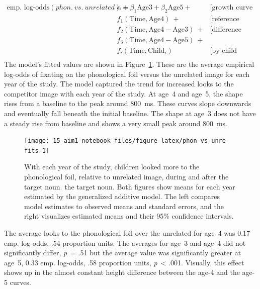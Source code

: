 \documentclass [11pt, proquest] {uwthesis}[2015/03/03]
\begin{document}
\small
\begin{align*}
   \text{emp. log-odds}(\mathit{phon.\ vs.\ unrelated}) =\
   & \alpha + \beta_1\text{Age3} + \beta_2\text{Age5} +\ &\text{[growth curve averages]} \\
   & f_1(\text{Time}, \text{Age4})\ +                    &\text{[reference smooth]} \\
   & f_2(\text{Time}, \text{Age4} - \text{Age3})\ +      &\text{[difference smooths]} \\
   & f_3(\text{Time}, \text{Age4} - \text{Age5})\ +      & \\
   & f_i(\text{Time}, \text{Child}_i)                    &\text{[by-child random smooths]} \\
\end{align*}
The model's fitted values are shown in
Figure~\ref{fig:phon-vs-unre-fits}. These are the average empirical
log-odds of fixating on the phonological foil versus the unrelated image
for each year of the study. The model captured the trend for increased
looks to the competitor image with each year of the study. At age~4 and
age~5, the shape rises from a baseline to the peak around 800~ms. These
curves slope downwards and eventually fall beneath the initial baseline.
The shape at age~3 does not have a steady rise from baseline and shows a
very small peak around 800~ms.







\begin{figure}
\texttt{[image: 15-aim1-notebook\_files/figure-latex/phon-vs-unre-fits-1]} \caption{With each year of the study, children looked
more to the phonological foil, relative to unrelated image, during and
after the target noun. the target noun. Both figures show means for each
year estimated by the generalized additive model. The left compares
model estimates to observed means and standard errors, and the right
visualizes estimated means and their 95\% confidence intervals.}\label{fig:phon-vs-unre-fits}
\end{figure}
The average looks to the phonological foil over the unrelated for age~4
was 0.17 emp. log-odds, .54 proportion units. The averages for age~3 and
age~4 did not significantly differ, \emph{p}~= .51 but the average value
was significantly greater at age~5, 0.33 emp. log-odds, .58 proportion
units, \emph{p}~\textless{} .001. Visually, this effect shows up in the
almost constant height difference between the age-4 and the age-5
curves.
\end{document}

